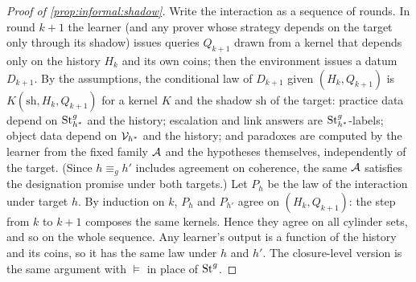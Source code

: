 \begin{proof}[Proof of \cref{prop:informal:shadow}]
Write the interaction as a sequence of rounds. In round $k+1$ the learner (and any prover whose strategy depends on the target only through its shadow) issues queries $Q_{k+1}$ drawn from a kernel that depends only on the history $H_k$ and its own coins; then the environment issues a datum $D_{k+1}$. By the assumptions, the conditional law of $D_{k+1}$ given $(H_k,Q_{k+1})$ is $K(\mathrm{sh},H_k,Q_{k+1})$ for a kernel $K$ and the shadow $\mathrm{sh}$ of the target: practice data depend on $\mathrm{St}^{g}_{h^*}$ and the history; escalation and link answers are $\mathrm{St}^{g}_{h^*}$-labels; object data depend on $\mathcal V_{h^*}$ and the history; and paradoxes are computed by the learner from the fixed family $\mathcal{A}$ and the hypotheses themselves, independently of the target. (Since $h\equiv_gh'$ includes agreement on coherence, the same $\mathcal{A}$ satisfies the designation promise under both targets.) Let $P_h$ be the law of the interaction under target $h$. By induction on $k$, $P_h$ and $P_{h'}$ agree on $(H_k,Q_{k+1})$: the step from $k$ to $k+1$ composes the same kernels. Hence they agree on all cylinder sets, and so on the whole sequence. Any learner's output is a function of the history and its coins, so it has the same law under $h$ and $h'$. The closure-level version is the same argument with ${\models}$ in place of $\mathrm{St}^{g}_{}$.
\end{proof}

